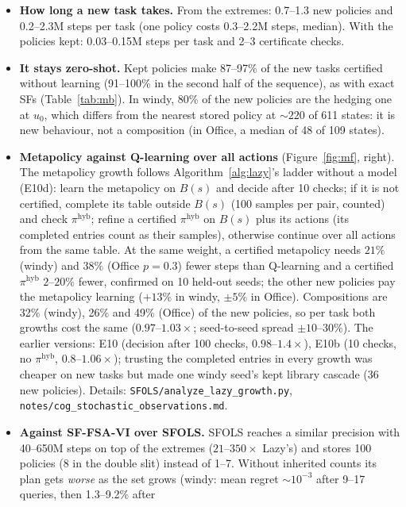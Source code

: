 \documentclass[11pt]{article}
\begin{document}
\begin{itemize}\setlength\itemsep{2pt}
\item \textbf{How long a new task takes.} From the extremes: 0.7--1.3 new policies and 0.2--2.3M steps per task (one
policy costs 0.3--2.2M steps, median). With the policies kept: 0.03--0.15M steps per task and 2--3 certificate checks.
\item \textbf{It stays zero-shot.} Kept policies make 87--97\% of the new tasks certified without learning (91--100\%
in the second half of the sequence), as with exact SFs (Table~\ref{tab:mb}). In windy, 80\% of the new policies are the
hedging one at $u_0$, which differs from the nearest stored policy at $\sim220$ of 611 states: it is new behaviour, not a
composition (in Office, a median of 48 of 109 states).
\item \textbf{Metapolicy against Q-learning over all actions} (Figure~\ref{fig:mf}, right). The metapolicy growth
follows Algorithm~\ref{alg:lazy}'s ladder without a model (E10d): learn the metapolicy on $B(s)$ and decide after 10
checks; if it is not certified, complete its table outside $B(s)$ (100 samples per pair, counted) and check
$\pi^{\mathrm{hyb}}$; refine a certified $\pi^{\mathrm{hyb}}$ on $B(s)$ plus its actions (its completed entries count as their
samples), otherwise continue over all actions from the same table. At the same weight, a certified metapolicy needs
$21\%$ (windy) and $38\%$ (Office $p=0.3$) fewer steps than Q-learning and a certified $\pi^{\mathrm{hyb}}$ $2$--$20\%$
fewer, confirmed on 10 held-out seeds; the other new policies pay the metapolicy learning ($+13\%$ in windy, $\pm5\%$
in Office). Compositions are 32\% (windy), 26\% and 49\% (Office) of the new policies, so per task both growths cost
the same ($0.97$--$1.03\times$; seed-to-seed spread $\pm10$--$30\%$). The earlier versions: E10 (decision after 100
checks, $0.98$--$1.4\times$), E10b (10 checks, no $\pi^{\mathrm{hyb}}$, $0.8$--$1.06\times$); trusting the completed entries
in every growth was cheaper on new tasks but made one windy seed's kept library cascade (36 new policies).
Details: \texttt{SFOLS/analyze\_lazy\_growth.py}, \texttt{notes/cog\_stochastic\_observations.md}.
\item \textbf{Against SF-FSA-VI over SFOLS.} SFOLS reaches a similar precision with 40--650M steps on top of the
extremes ($21$--$350\times$ Lazy's) and stores 100 policies (8 in the double slit) instead of 1--7. Without inherited counts its plan
gets \emph{worse} as the set grows (windy: mean regret $\sim10^{-3}$ after 9--17 queries, then 1.3--9.2\% after

\end{itemize}
\end{document}
